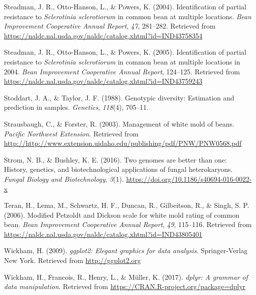 \documentclass[fleqn,10pt,lineno]{wlpeerj} %
\theoremstyle{definition}
\theoremstyle{definition}
\theoremstyle{definition}
\theoremstyle{remark}
\begin{document}
\hypertarget{ref-steadman2004identification}{}
Steadman, J. R., Otto-Hanson, L., \& Powers, K. (2004). Identification
of partial resistance to \emph{Sclerotinia sclerotiorum} in common bean
at multiple locations. \emph{Bean Improvement Cooperative Annual
Report}, \emph{47}, 281--282. Retrieved from
\url{https://naldc.nal.usda.gov/naldc/catalog.xhtml?id=IND43758354}

\hypertarget{ref-steadman2005identification}{}
Steadman, J. R., Otto-Hanson, L., \& Powers, K. (2005). Identification
of partial resistance to \emph{Sclerotinia sclerotiorum} in common bean
at multiple locations in 2004. \emph{Bean Improvement Cooperative Annual
Report}, 124--125. Retrieved from
\url{https://naldc.nal.usda.gov/naldc/catalog.xhtml?id=IND43759243}

\hypertarget{ref-stoddart1988genotypic}{}
Stoddart, J. A., \& Taylor, J. F. (1988). Genotypic diversity:
Estimation and prediction in samples. \emph{Genetics}, \emph{118}(4),
705--11.

\hypertarget{ref-strausbaugh2003management}{}
Strausbaugh, C., \& Forster, R. (2003). Management of white mold of
beans. \emph{Pacific Northwest Extension}. Retrieved from
\url{http://http://www.extension.uidaho.edu/publishing/pdf/PNW/PNW0568.pdf}

\hypertarget{ref-strom2016genomes}{}
Strom, N. B., \& Bushley, K. E. (2016). Two genomes are better than one:
History, genetics, and biotechnological applications of fungal
heterokaryons. \emph{Fungal Biology and Biotechnology}, \emph{3}(1).
\url{https://doi.org/10.1186/s40694-016-0022-x}

\hypertarget{ref-teran2006modified}{}
Teran, H., Lema, M., Schwartz, H. F., Duncan, R., Gilbeitson, R., \&
Singh, S. P. (2006). Modified Petzoldt and Dickson scale for white mold
rating of common bean. \emph{Bean Improvement Cooperative Annual
Report}, \emph{49}, 115--116. Retrieved from
\url{https://naldc.nal.usda.gov/naldc/catalog.xhtml?id=IND43805401}

\hypertarget{ref-ggplot2}{}
Wickham, H. (2009). \emph{ggplot2: Elegant graphics for data analysis}.
Springer-Verlag New York. Retrieved from \url{http://ggplot2.org}

\hypertarget{ref-dplyr}{}
Wickham, H., Francois, R., Henry, L., \& Müller, K. (2017). \emph{dplyr:
A grammar of data manipulation}. Retrieved from
\url{https://CRAN.R-project.org/package=dplyr}
\end{document}
